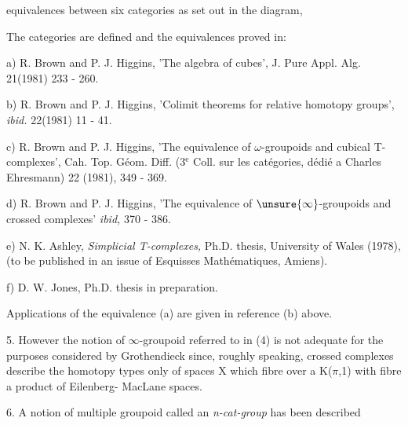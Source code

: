 
equivalences between six categories as set out in the diagram,


The categories are defined and the equivalences proved in:

a) R. Brown and P. J. Higgins, 'The algebra of cubes',
J. Pure Appl. Alg. 21(1981) 233 - 260.

b) R. Brown and P. J. Higgins, 'Colimit theorems for relative
homotopy groups', \textit{ibid.} 22(1981) 11 - 41.

c) R. Brown and P. J. Higgins, 'The equivalence of $\omega$-groupoids and
cubical T-complexes', Cah. Top. Géom. Diff. (3$^{\text{e}}$ Coll. sur les
catégories, dédié a Charles Ehresmann) 22 (1981), 349 - 369.

d) R. Brown and P. J. Higgins, 'The equivalence of $\unsure{\infty}$-groupoids and
crossed complexes' \textit{ibid,} 370 - 386.

e) N. K. Ashley, \textit{Simplicial T-complexes,} Ph.D. thesis, University
of Wales (1978),(to be published in an issue of Esquisses
Mathématiques, Amiens).

f) D. W. Jones, Ph.D. thesis in preparation.

Applications of the equivalence (a) are given in reference (b)
above.

5. However the notion of $\infty$-groupoid referred to in (4) is not adequate
for the purposes considered by Grothendieck since, roughly speaking,
crossed complexes describe the homotopy types only of spaces X
which fibre over a K($\pi$,1) with fibre a product of Eilenberg-
MacLane spaces.

6. A notion of multiple groupoid called an \textit{n-cat-group} has been described


